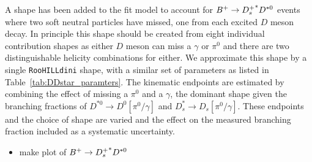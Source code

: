 {A shape has been added to the fit model to account for ${B}^+ \rightarrow {\ensuremath{{D}^+_{s}}}^{*} D^{*0}$ events where two soft neutral particles have missed, one from each excited $D$ meson decay. In principle this shape should be created from eight individual contribution shapes as either $D$ meson can miss a $\gamma$ or $\pi^{0}$ and there are two distinguishable helicity combinations for either. We approximate this shape by a single \texttt{RooHILLdini} shape, with a similar set of parameters as listed in Table~\ref{tab:DDstar_paramters}. The kinematic endpoints are estimated by combining the effect of missing a $\pi^{0}$ and a $\gamma$, the dominant shape given the branching fractions of $D^{*0} \to D^{0} [\pi^{0}/\gamma]$ and $D_{s}^{*} \to D_{s} [\pi^{0}/\gamma]$. These endpoints and the choice of shape are varied and the effect on the measured branching fraction included as a systematic uncertainty. 

}

{\color{Red}
\begin{itemize}
\item make plot of ${B}^+ \rightarrow {\ensuremath{{D}^+_{s}}}^{*} D^{*0}$
\end{itemize}
}

